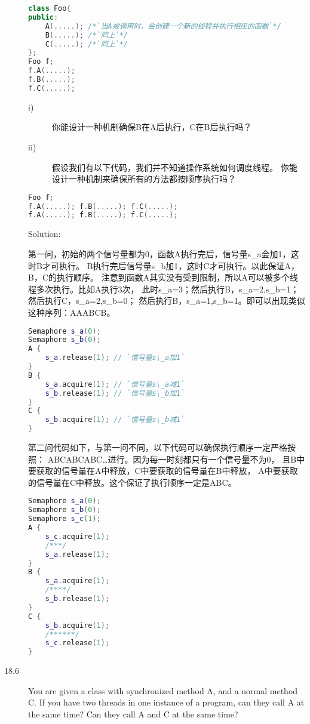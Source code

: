 \begin{description}
\begin{lstlisting}[language=C++]
class Foo{
public:
    A(.....); /*`当A被调用时，会创建一个新的线程并执行相应的函数`*/
    B(.....); /*`同上`*/
    C(.....); /*`同上`*/
};
Foo f;
f.A(.....);
f.B(.....);
f.C(.....);
\end{lstlisting}
\begin{description}
\item[i)] 你能设计一种机制确保B在A后执行，C在B后执行吗？
\item[ii)] 假设我们有以下代码，我们并不知道操作系统如何调度线程。 你能设计一种机制来确保所有的方法都按顺序执行吗？
\end{description}
\begin{lstlisting}[language=C++]
Foo f;
f.A(.....); f.B(.....); f.C(.....); 
f.A(.....); f.B(.....); f.C(.....);
\end{lstlisting}

Solution: 

第一问，初始的两个信号量都为0，函数A执行完后，信号量s\_a会加1，这时B才可执行。 B执行完后信号量s\_b加1，这时C才可执行。以此保证A，B，C的执行顺序。 注意到函数A其实没有受到限制，所以A可以被多个线程多次执行。比如A执行3次， 此时s\_a=3；然后执行B，s\_a=2,s\_b=1；然后执行C，s\_a=2,s\_b=0； 然后执行B，s\_a=1,s\_b=1。即可以出现类似这种序列：AAABCB。
\begin{lstlisting}[language=C++]
Semaphore s_a(0);
Semaphore s_b(0);
A {
    s_a.release(1); // `信号量s\_a加1`
}
B {
    s_a.acquire(1); // `信号量s\_a减1`
    s_b.release(1); // `信号量s\_b加1`
}
C {
    s_b.acquire(1); // `信号量s\_b减1`
}
\end{lstlisting}
第二问代码如下，与第一问不同，以下代码可以确保执行顺序一定严格按照： ABCABCABC…进行。因为每一时刻都只有一个信号量不为0， 且B中要获取的信号量在A中释放，C中要获取的信号量在B中释放， A中要获取的信号量在C中释放。这个保证了执行顺序一定是ABC。
\begin{lstlisting}[language=C++]
Semaphore s_a(0);
Semaphore s_b(0);
Semaphore s_c(1);
A {
    s_c.acquire(1);
    /***/
    s_a.release(1);
}
B {
    s_a.acquire(1);
    /****/
    s_b.release(1);
}
C {
    s_b.acquire(1);
    /******/
    s_c.release(1);
}
\end{lstlisting}

%


\item[18.6] You are given a class with synchronized method A, and a normal method C. If you have two threads in one instance of a program, can they call A at the same time? Can they call A and C at the same time?
%

\end{description}
